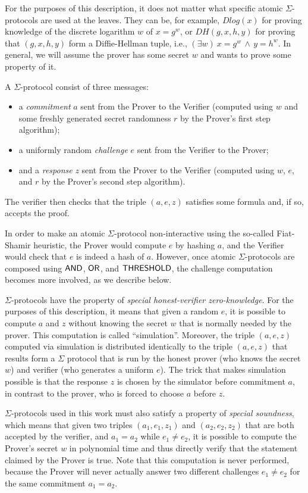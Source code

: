\documentclass[11pt]{llncs}
\begin{document}
For the purposes of this description, it does not matter what specific atomic $\Sigma$-protocols are used at the leaves. They can be, for example, $Dlog(x)$ for proving knowledge of the discrete logarithm $w$ of $x=g^w$, or $DH(g, x, h, y)$ for proving that $(g, x, h, y)$ form a Diffie-Hellman tuple, i.e., $(\exists w) \ x = g^w \, \wedge \, y = h^w$. In general, we will assume the prover has some secret $w$ and wants to prove some property of it. 

A $\Sigma$-protocol consist of three messages: 

\begin{itemize}
\item a \emph{commitment} $a$ sent from the Prover to the Verifier (computed using $w$ and some freshly generated secret randomness $r$ by the Prover's first step algorithm);
\item a uniformly random \emph{challenge} $e$ sent from the Verifier to the Prover;
\item and a \emph{response} $z$ sent from the Prover to the Verifier (computed using $w$, $e$, and $r$ by the Prover's second step algorithm). 
\end{itemize}
The verifier then checks that the triple $(a, e, z)$ satisfies some formula and, if so, accepts the proof.

In order to make an atomic $\Sigma$-protocol non-interactive using the so-called Fiat-Shamir heuristic, the Prover would compute $e$ by hashing $a$, and the Verifier would check that $e$ is indeed a hash of $a$. However, once atomic $\Sigma$-protocols are composed using $\mathsf{AND}$, $\mathsf{OR}$, and $\mathsf{THRESHOLD}$, the challenge computation becomes more involved, as we describe below.

$\Sigma$-protocols have the property of \emph{special honest-verifier zero-knowledge}. For the purposes of this description, it means that given a random $e$, it is possible to compute $a$ and $z$ without knowing the secret $w$ that is normally needed by the prover. This computation is called ``simulation''. Moreover, the triple $(a, e, z)$  computed via simulation is distributed identically to the triple $(a, e, z)$ that results form a $\Sigma$ protocol that is run by the honest prover (who knows the secret $w$) and verifier (who generates a uniform $e$). The trick that makes simulation possible is that the response $z$ is chosen by the simulator before commitment $a$, in contrast to the prover, who is forced to choose $a$ before $z$.

$\Sigma$-protocols used in this work must also satisfy a property of \emph{special soundness}, which means that given two triples $(a_1, e_1, z_1)$ and $(a_2, e_2, z_2)$ that are both accepted by the verifier, and $a_1=a_2$ while $e_1\neq e_2$, it is possible to compute the Prover's secret $w$ in polynomial time and thus directly verify that the statement claimed by the Prover is true.   Note that this computation is never performed, because the Prover will never actually answer two different challenges $e_1\neq e_2$ for the same commitment $a_1=a_2$. 
\end{document}
